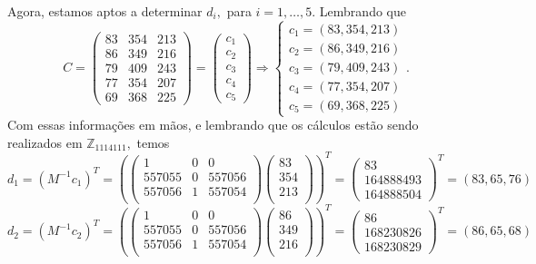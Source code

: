 \documentclass[oneside,a4paper,12pt]{article}
\theoremstyle{definition}
\theoremstyle{plain}
\theoremstyle{solu}
\theoremstyle{dotlessP}
\begin{document}
Agora, estamos aptos a determinar $d_i,$ para $i = 1, \ldots, 5.$ Lembrando que 
\[ C = \begin{pmatrix}
83 & 354 & 213  \\ 
86 & 349 & 216  \\ 
79 & 409 & 243  \\
77 & 354 & 207 \\
69 & 368 & 225
\end{pmatrix} = \begin{pmatrix}
c_1 \\
c_2 \\
c_3 \\
c_4 \\
c_5
\end{pmatrix} \Rightarrow \begin{cases}
c_1 = (83, 354, 213) \\
c_2 = (86, 349, 216) \\
c_3 = (79, 409, 243) \\
c_4 = (77, 354, 207) \\
c_5 = (69, 368, 225)
\end{cases}.
\]
Com essas informações em mãos, e lembrando que os cálculos estão sendo realizados em $\mathbb{Z}_{1114111},$ temos
\[
d_1 = (M^{-1}c_1)^T =  \left(\begin{pmatrix}
1 & 0 & 0 \\
557055 & 0 & 557056 \\
557056 & 1 & 557054\\
\end{pmatrix}  \begin{pmatrix}
83 \\
354 \\
213 \\
\end{pmatrix}\right)^T = \left(\begin{matrix}
83 \\
164888493 \\
164888504
\end{matrix}\right)^T = (83, 65, 76)
\]
\[
d_2 = (M^{-1}c_2)^T =  \left(\begin{pmatrix}
1 & 0 & 0 \\
557055 & 0 & 557056 \\
557056 & 1 & 557054\\
\end{pmatrix}  \begin{pmatrix}
86 \\
349\\
216 \\
\end{pmatrix}\right)^T = \left(\begin{matrix}
86 \\
168230826 \\
168230829
\end{matrix}\right)^T = (86, 65, 68)
\]
\end{document}
